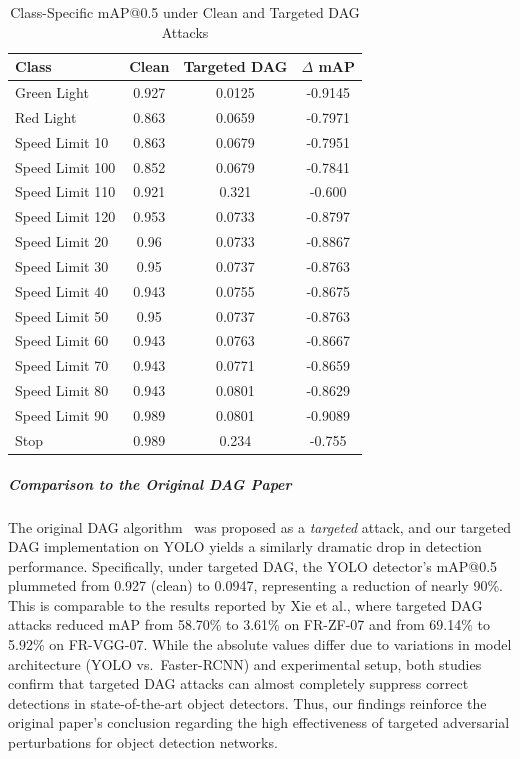 \documentclass[../main.tex]{subfiles}
\begin{document}
\begin{table}[H]
    \centering
    \caption{Class-Specific mAP@0.5 under Clean and Targeted DAG Attacks}
    \label{tab:yolo_dag_targeted_class_results}
    \footnotesize
    \begin{tabular}{@{\hspace{0.3cm}}lS[table-format=1.3]S[table-format=1.3]S[table-format=-1.3]@{\hspace{0.3cm}}}
        \toprule
        \textbf{Class} & {\textbf{Clean}} & {\textbf{Targeted DAG}} & {\textbf{$\Delta$ mAP}} \\
        \midrule
        Green Light    & 0.927 & 0.0125 & -0.9145 \\
        Red Light      & 0.863 & 0.0659 & -0.7971 \\
        Speed Limit 10 & 0.863 & 0.0679 & -0.7951 \\
        Speed Limit 100 & 0.852 & 0.0679 & -0.7841 \\
        Speed Limit 110 & 0.921 & 0.321 & -0.600 \\
        Speed Limit 120 & 0.953 & 0.0733 & -0.8797 \\
        Speed Limit 20 & 0.96 & 0.0733 & -0.8867 \\
        Speed Limit 30 & 0.95 & 0.0737 & -0.8763 \\
        Speed Limit 40 & 0.943 & 0.0755 & -0.8675 \\
        Speed Limit 50 & 0.95 & 0.0737 & -0.8763 \\
        Speed Limit 60 & 0.943 & 0.0763 & -0.8667 \\
        Speed Limit 70 & 0.943 & 0.0771 & -0.8659 \\
        Speed Limit 80 & 0.943 & 0.0801 & -0.8629 \\
        Speed Limit 90 & 0.989 & 0.0801 & -0.9089 \\
        Stop           & 0.989 & 0.234 & -0.755 \\
        \bottomrule
    \end{tabular}
\end{table}


\subparagraph{Comparison to the Original DAG Paper}
The original DAG algorithm~\cite{xie2017DAG} was proposed as a \textit{targeted} attack, and our targeted DAG implementation on YOLO yields a similarly dramatic drop in detection performance. Specifically, under targeted DAG, the YOLO detector's mAP@0.5 plummeted from 0.927 (clean) to 0.0947, representing a reduction of nearly 90\%. This is comparable to the results reported by Xie et al., where targeted DAG attacks reduced mAP from 58.70\% to 3.61\% on FR-ZF-07 and from 69.14\% to 5.92\% on FR-VGG-07\cite{xie2017DAG}. While the absolute values differ due to variations in model architecture (YOLO vs.\ Faster-RCNN) and experimental setup, both studies confirm that targeted DAG attacks can almost completely suppress correct detections in state-of-the-art object detectors. Thus, our findings reinforce the original paper's conclusion regarding the high effectiveness of targeted adversarial perturbations for object detection networks.
\end{document}
